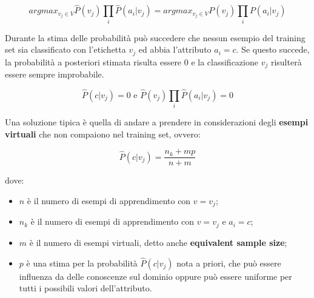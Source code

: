 $$ 
argmax_{v_j \in V} \hat{P}(v_j)\prod_i \hat{P}(a_i | v_j) = argmax_{v_j \in V} P(v_j)\prod_i P(a_i | v_j)
$$

Durante la stima delle probabilità può succedere che nessun esempio del training set sia classificato con l'etichetta $v_j$ ed abbia l'attributo $a_i = c$.
Se questo succede, la probabilità a posteriori stimata risulta essere 0 e la classificazione $v_j$ risulterà essere sempre improbabile.

$$ \hat{P}(c | v_j) = 0 \text{ e } \hat{P}(v_j)\prod_i \hat{P}(a_i | v_j) = 0$$

Una soluzione tipica è quella di andare a prendere in considerazioni degli \textbf{esempi virtuali} che non compaiono nel training set, ovvero:

$$
\hat{P}(c | v_j) = \frac{n_k + mp}{n +m}
$$

dove:

\begin{itemize}
	\item $n$ è il numero di esempi di apprendimento con $v = v_j$;
	\item $n_k$ è il numero di esempi di apprendimento con $v = v_j \text{ e } a_i = c$;
	\item $m$ è il numero di esempi virtuali, detto anche \textbf{equivalent sample size};
	\item $p$ è una stima per la probabilità $\hat{P}(c | v_j)$ nota a priori, che può essere influenza da delle conoscenze sul dominio oppure può essere uniforme per tutti i possibili valori dell'attributo.
\end{itemize}









